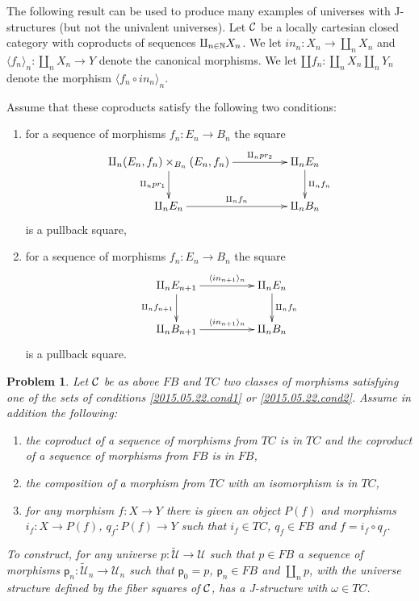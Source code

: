 \documentclass[12pt]{article}
\numberwithin{equation}{section}
\newtheorem{problem}[proposition]{Problem}
\newcommand{\llabel}[1]{\label{#1}}
\newcommand{\sr}{\rightarrow}
\newcommand{\nn}{{\mathbb N\rm}}
\newcommand{\wt}{\widetilde}
\newcommand{\p}{\mathsf{p}}
\newcommand{\U}{\mathcal{U}}
\begin{document}
%

The following result can be used to produce many examples of universes with
J-structures (but not the univalent universes). Let $\cal C$ be a locally
cartesian closed category with coproducts of sequences
$\amalg_{n\in\nn}X_n$. We let $in_n:X_n\sr \amalg_n X_n$ and $\langle f_n
\rangle_{n} : \amalg_n X_n\sr Y$ denote the canonical morphisms. We let $\amalg
f_n : \amalg_n X_n \amalg_n Y_n$ denote the morphism $\langle f_n\circ in_n
\rangle_{n}$.

Assume that these coproducts satisfy the following two conditions:
%
\begin{enumerate}
\item for a sequence of morphisms $f_n:E_n\sr B_n$ the square
%
$$
\begin{xy}
          \xymatrix@C=4pc{ \amalg_n (E_n,f_n)\times_{B_n}(E_n,f_n)
            \ar[r]^-{\amalg_n pr_2} \ar[d]_{\amalg_n pr_1} & \amalg_n E_n
            \ar[d]^{\amalg_n f_n}\\ \amalg_n E_n \ar[r]^-{\amalg_n f_n} &
            \amalg_n B_n }
\end{xy}
$$
%
is a pullback square,
%
\item for a sequence of morphisms $f_n:E_n\sr B_n$ the square
%
$$
\begin{xy}
          \xymatrix@C=4pc{ \amalg_n E_{n+1} \ar[r]^-{\langle in_{n+1}
              \rangle_{n}} \ar[d]_{\amalg_n f_{n+1}} & \amalg_n E_n
            \ar[d]^{\amalg_n f_n}\\ \amalg_n B_{n+1} \ar[r]^-{\langle in_{n+1}
              \rangle_{n}} & \amalg_n B_n }
\end{xy}
$$
%
is a pullback square.
\end{enumerate}
%
%
\begin{problem}
\llabel{2015.05.22.th2} Let $\cal C$ be as above $FB$ and $TC$ two classes of
morphisms satisfying one of the sets of conditions \ref{2015.05.22.cond1} or
\ref{2015.05.22.cond2}. Assume in addition the following:
%
\begin{enumerate}
\item the coproduct of a sequence of morphisms from $TC$ is in $TC$ and the
  coproduct of a sequence of morphisms from $FB$ is in $FB$,
\item the composition of a morphism from $TC$ with an isomorphism is in $TC$,
\item for any morphism $f: X \sr Y$ there is given an object $P(f)$ and
  morphisms $i_f:X\sr P(f)$, $q_f:P(f)\sr Y$ such that $i_f\in TC$, $q_f\in FB$
  and $f=i_f\circ q_f$.
\end{enumerate}
%
To construct, for any universe $p: \wt{\U}\sr \U$ such that $p\in FB$ a sequence
of morphisms $\p_n:\wt{\U}_n\sr \U_n$ such that $\p_0=p$, $\p_n\in FB$ and $\amalg_n
p$, with the universe structure defined by the fiber squares of $\cal C$, has a
J-structure with $\omega\in TC$.
\end{problem}
\end{document}

